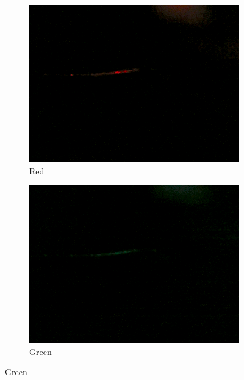\begin{figure}
	\begin{subfigure}{0.24\textwidth}
		\includegraphics[width=\linewidth, keepaspectratio=true]{./fig/Vision/Dataset/automated_datasets/2_created_datasets/1_Birthday_dataset/b_003_p_005_b_l_006_red_B.png}
		\caption{Red}
	\end{subfigure}
	\hspace*{\fill}
	\begin{subfigure}{0.24\textwidth}
		\includegraphics[width=\linewidth, keepaspectratio=true]{./fig/Vision/Dataset/automated_datasets/2_created_datasets/1_Birthday_dataset/b_003_p_005_b_l_006_green_B.png}
		\caption{Green}
	\end{subfigure}

\end{figure}
